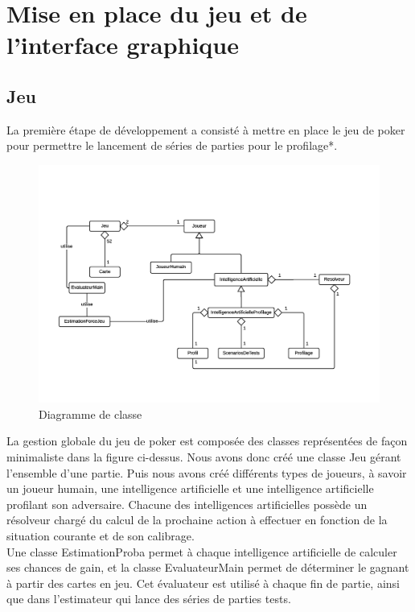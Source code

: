 \documentclass{report}
\begin{document}
\chapter{Mise en place du jeu et de l'interface graphique}
\section{Jeu}

\hspace{0.5cm}La première étape de développement a consisté à mettre en place le jeu de poker pour permettre le lancement de séries de parties pour le profilage*.

\begin{figure}[H]
\hspace{-1.5cm}
		\includegraphics[scale=0.6]{./imagesRapport/DiagClasseJeu.png}
	\caption[Diagramme de classe]{Diagramme de classe}
\end{figure}

La gestion globale du jeu de poker est composée des classes représentées de façon minimaliste dans la figure ci-dessus. Nous avons donc créé une classe Jeu gérant l'ensemble d'une partie. Puis nous avons créé différents types de joueurs, à savoir un joueur humain, une intelligence artificielle et une intelligence artificielle profilant son adversaire. Chacune des intelligences artificielles possède un résolveur chargé du calcul de la prochaine action à effectuer en fonction de la situation courante et de son calibrage.\\

Une classe EstimationProba permet à chaque intelligence artificielle de calculer ses chances de gain, et la classe EvaluateurMain permet de déterminer le gagnant à partir des cartes en jeu. Cet évaluateur est utilisé à chaque fin de partie, ainsi que dans l'estimateur qui lance des séries de parties tests.\\
 
\end{document}
